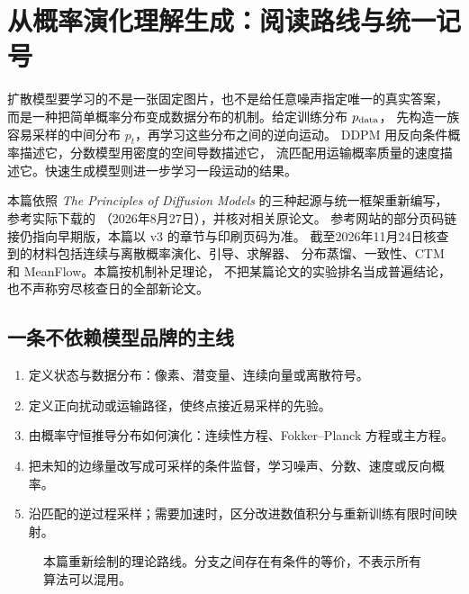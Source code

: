 \chapter{从概率演化理解生成：阅读路线与统一记号}
\label{th:roadmap}

扩散模型要学习的不是一张固定图片，也不是给任意噪声指定唯一的真实答案，
而是一种把简单概率分布变成数据分布的机制。给定训练分布 $p_{\rm data}$，
先构造一族容易采样的中间分布 $p_t$，再学习这些分布之间的逆向运动。
DDPM 用反向条件概率描述它，分数模型用密度的空间导数描述它，
流匹配用运输概率质量的速度描述它。快速生成模型则进一步学习一段运动的结果。

本篇依照 \emph{The Principles of Diffusion Models} 的三种起源与统一框架重新编写，
参考实际下载的 （2026年8月27日），并核对相关原论文。
参考网站的部分页码链接仍指向早期版，本篇以 v3 的章节与印刷页码为准。
截至2026年11月24日核查到的材料包括连续与离散概率演化、引导、求解器、
分布蒸馏、一致性、CTM 和 MeanFlow。本篇按机制补足理论，
不把某篇论文的实验排名当成普遍结论，也不声称穷尽核查日的全部新论文。

\section{一条不依赖模型品牌的主线}

\begin{enumerate}
\item 定义状态与数据分布：像素、潜变量、连续向量或离散符号。
\item 定义正向扰动或运输路径，使终点接近易采样的先验。
\item 由概率守恒推导分布如何演化：连续性方程、Fokker--Planck 方程或主方程。
\item 把未知的边缘量改写成可采样的条件监督，学习噪声、分数、速度或反向概率。
\item 沿匹配的逆过程采样；需要加速时，区分改进数值积分与重新训练有限时间映射。
\end{enumerate}

\begin{figure}[htbp]
\centering
{}
\caption{本篇重新绘制的理论路线。分支之间存在有条件的等价，不表示所有算法可以混用。}
\end{figure}

